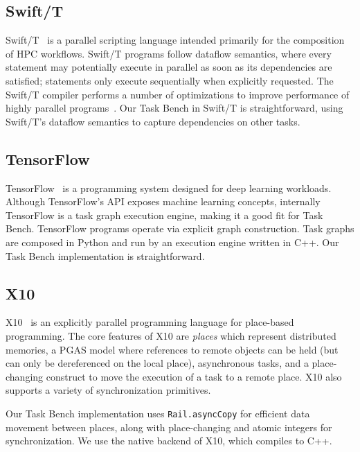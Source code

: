 \subsection{Swift/T}

Swift/T~\cite{Wozniak13} is a parallel scripting language intended
primarily for the composition of HPC workflows. Swift/T
programs follow dataflow semantics, where every statement may
potentially execute in parallel as soon as its dependencies are
satisfied; statements only execute sequentially when explicitly
requested. The Swift/T compiler performs a number of optimizations to
improve performance of highly parallel programs~\cite{Armstrong14}. Our Task Bench in Swift/T is straightforward, using Swift/T's dataflow
semantics to capture dependencies on other tasks.

\subsection{TensorFlow}

TensorFlow~\cite{TensorFlow15} is a programming system designed for
deep learning workloads. Although TensorFlow's API exposes
machine learning concepts, internally TensorFlow is a task graph execution engine, making it a good fit for
Task Bench. TensorFlow programs operate via explicit graph construction. Task graphs are composed in Python and run by an
execution engine written in C++. Our Task Bench implementation is straightforward.

\subsection{X10}

X10~\cite{X1005} is an explicitly parallel programming language for
place-based programming. The core features of X10 are \emph{places}
which represent distributed memories, a PGAS model where references to
remote objects can be held (but can only be dereferenced on the local
place), asynchronous tasks, and a place-changing construct to move the
execution of a task to a remote place. X10 also supports a variety of
synchronization primitives.

Our Task Bench implementation uses
\lstinline[language=X10]{Rail.asyncCopy} for efficient data movement
between places, along with place-changing and atomic integers for
synchronization. We use the native backend of X10, which compiles to
C++.
